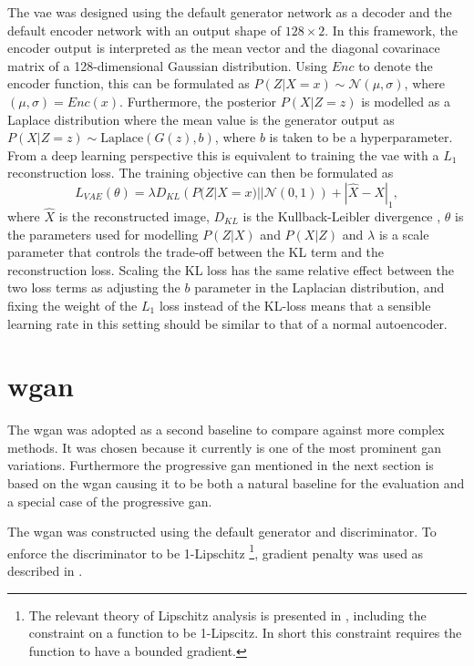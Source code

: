 The \acrlong{vae} was designed using the default generator network as a decoder and the default encoder network with an output shape of $128\times2$. In this framework, the encoder output is interpreted as the mean vector and the diagonal covarinace matrix of a 128-dimensional Gaussian distribution. Using $Enc$ to denote the encoder function, this can be formulated as $P(Z|X=x) \sim \mathcal{N}(\mu, \sigma)$, where $(\mu, \sigma) = Enc(x)$. Furthermore, the posterior $P(X|Z=z)$ is modelled as a Laplace distribution where the mean value is the generator output as $P(X|Z=z) \sim \text{Laplace}(G(z), b)$, where $b$ is taken to be a hyperparameter. From a deep learning perspective this is equivalent to training the \acrshort{vae} with a $L_1$ reconstruction loss. The training objective can then be formulated as 
\begin{equation}
    L_{VAE}(\theta) = \lambda D_{KL}\left(P(Z|X=x) || \mathcal{N}(0,1)\right) + |\hat{X} - X|_1,
\end{equation}
where $\hat{X}$ is the reconstructed image, $D_{KL}$ is the Kullback-Leibler divergence \parencite{kullback1951information}, $\theta$ is the parameters used for modelling $P(Z|X)$ and $P(X|Z)$ and $\lambda$ is a scale parameter that controls the trade-off between the KL term and the reconstruction loss. Scaling the KL loss has the same relative effect between the two loss terms as adjusting the $b$ parameter in the Laplacian distribution, and fixing the weight of the $L_1$ loss instead of the KL-loss means that a sensible learning rate in this setting should be similar to that of a normal autoencoder. 

\section{\acrlong{wgan}}
The \acrfull{wgan} was adopted as a second baseline to compare against more complex methods. It was chosen because it currently is one of the most prominent \acrshort{gan} variations. Furthermore the progressive \acrshort{gan} mentioned in the next section is based on the \acrshort{wgan} causing it to be both a natural baseline for the evaluation and a special case of the progressive \acrshort{gan}. 

The \acrshort{wgan} was constructed using the default generator and discriminator. To enforce the discriminator to be 1-Lipschitz \footnote{The relevant theory of Lipschitz analysis is presented in \parencite{heinonen2005lectures}, including the constraint on a function to be 1-Lipscitz. In short this constraint requires the function to have a bounded gradient.}, gradient penalty was used as described in \parencite{gulrajani2017improved}.

